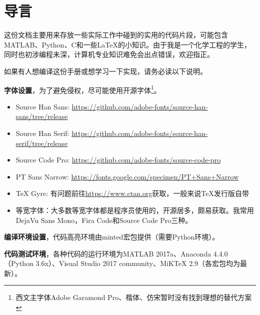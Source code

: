 \chapter*{导言}

这份文档主要用来存放一些实际工作中碰到的实用的代码片段，可能包含MATLAB、Python、C和一些\LaTeX{}的小知识。由于我是一个化学工程的学生，同时也初涉编程未深，计算机专业知识难免会出点错误，欢迎指正。

如果有人想编译这份手册或想学习一下实现，请务必读以下说明。

\textbf{字体设置}，为了避免侵权，尽可能使用开源字体\footnote{西文主字体Adobe Garamond Pro、楷体、仿宋暂时没有找到理想的替代方案}。

\begin{itemize}
\item Source Han Sans: \url{https://github.com/adobe-fonts/source-han-sans/tree/release}
\item Source Han Serif: \url{https://github.com/adobe-fonts/source-han-serif/tree/release}
\item Source Code Pro: \url{https://github.com/adobe-fonts/source-code-pro}
\item PT Sans Narrow: \url{https://fonts.google.com/specimen/PT+Sans+Narrow}
\item TeX Gyre: 有问题前往\url{https://www.ctan.org}获取，一般来说\TeX{}发行版自带
\item 等宽字体：大多数等宽字体都是程序员使用的，开源居多，颇易获取。我常用DejaVu Sans Mono，Fira Code和Source Code Pro三种。
\end{itemize}

\begin{TeXcode}
\usepackage{fontspec}
    \setmainfont{Adobe Garamond Pro}  %
    \setsansfont{TeX Gyre Heros}
    \setmonofont{Source Code Pro}  %

\usepackage{unicode-math}

\newfontfamily{}
\end{TeXcode}

\textbf{编译环境设置}，代码高亮环境由minted宏包提供（需要Python环境）。

\textbf{代码测试环境}，各种代码的运行环境为MATLAB 2017a、Anaconda 4.4.0（Python 3.6x）、Visual Studio 2017 community、MiK\TeX{} 2.9（各宏包均为最新）。